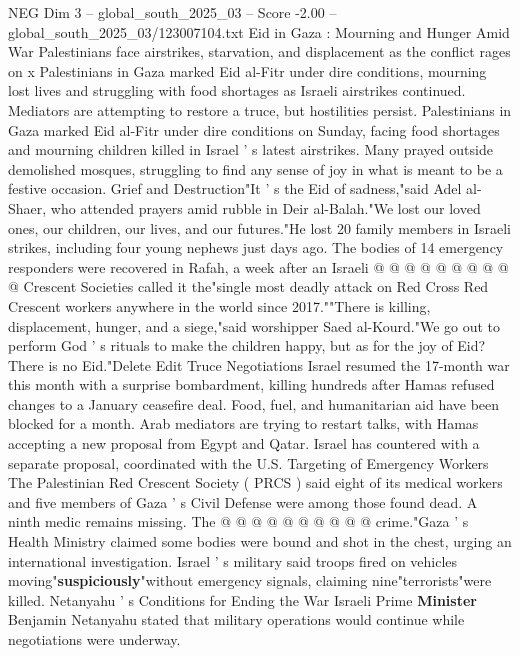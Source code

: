 \begin{textsample}{NEG Dim 3 – global\_south\_2025\_03 – Score -2.00 – global\_south\_2025\_03/123007104.txt}  \label{ex:f3_neg_418}
Eid in Gaza : Mourning and Hunger Amid War Palestinians face airstrikes, starvation, and displacement as the conflict rages on x Palestinians in Gaza marked Eid al-Fitr under dire conditions, mourning lost lives and struggling with food shortages as Israeli airstrikes continued.
Mediators are attempting to restore a truce, but hostilities persist.
Palestinians in Gaza marked Eid al-Fitr under dire conditions on Sunday, facing food shortages and mourning children killed in Israel ' s latest airstrikes.
Many prayed outside demolished mosques, struggling to find any sense of joy in what is meant to be a festive occasion.
Grief and Destruction"It ' s the Eid of sadness,"said Adel al-Shaer, who attended prayers amid rubble in Deir al-Balah."We lost our loved ones, our children, our lives, and our futures."He lost 20 family members in Israeli strikes, including four young nephews just days ago.
The bodies of 14 emergency responders were recovered in Rafah, a week after an Israeli @ @ @ @ @ @ @ @ @ @ Crescent Societies called it the"single most deadly attack on Red Cross Red Crescent workers anywhere in the world since 2017.""There is killing, displacement, hunger, and a siege,"said worshipper Saed al-Kourd."We go out to perform God ' s rituals to make the children happy, but as for the joy of Eid?
There is no Eid."Delete Edit Truce Negotiations Israel resumed the 17-month war this month with a surprise bombardment, killing hundreds after Hamas refused changes to a January ceasefire deal.
Food, fuel, and humanitarian aid have been blocked for a month.
Arab mediators are trying to restart talks, with Hamas accepting a new proposal from Egypt and Qatar.
Israel has countered with a separate proposal, coordinated with the U.S.
Targeting of Emergency Workers The Palestinian Red Crescent Society ( PRCS ) said eight of its medical workers and five members of Gaza ' s Civil Defense were among those found dead.
A ninth medic remains missing.
The @ @ @ @ @ @ @ @ @ @ crime."Gaza ' s Health Ministry claimed some bodies were bound and shot in the chest, urging an international investigation.
Israel ' s military said troops fired on vehicles moving"\textbf{suspiciously}"without emergency signals, claiming nine"terrorists"were killed.
Netanyahu ' s Conditions for Ending the War Israeli Prime \textbf{Minister} Benjamin Netanyahu stated that military operations would continue while negotiations were underway.

\end{textsample}
